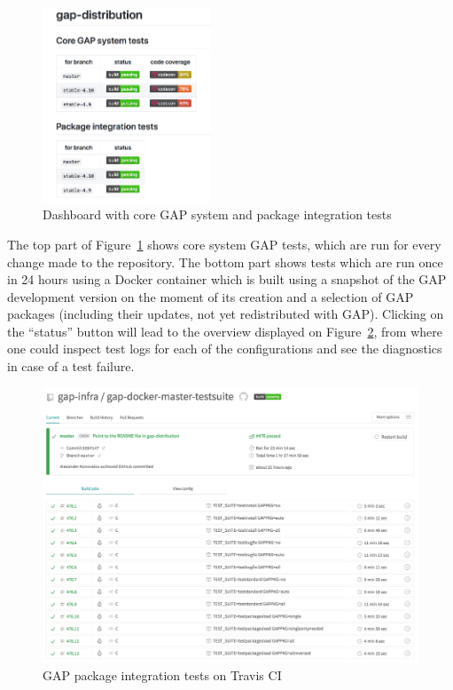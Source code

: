 \documentclass{deliverablereport}
\begin{document}
\begin{figure}[!ht]
    \centering
    \includegraphics[width=5cm]{images/gap-core-tests}
    \caption{Dashboard with core GAP system and package integration tests}
    \label{fig:gap-core-tests}
\end{figure}

The top part of Figure~\ref{fig:gap-core-tests} shows core system GAP tests,
which are run for every change made to the repository. The bottom part shows
tests which are run once in 24 hours using a Docker container which is built
using a snapshot of the GAP development version on the moment of its creation
and a selection of GAP packages (including their updates, not yet redistributed
with GAP). Clicking on the ``status'' button will lead to the overview displayed
on Figure~\ref{fig:gap-docker-master-testsuite}, from where one could inspect
test logs for each of the configurations and see the diagnostics in case of a
test failure.

\begin{figure}[!ht]
    \centering
    \includegraphics[width=\textwidth]{images/gap-docker-master-testsuite}
    \caption{GAP package integration tests on Travis CI}
    \label{fig:gap-docker-master-testsuite}
\end{figure}
\end{document}
